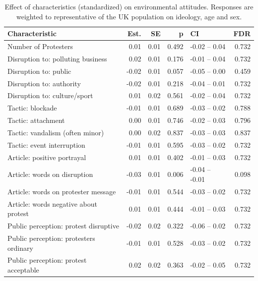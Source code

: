 \begin{table}[h!t]
\centering
\begin{tabular}{lrrrlr}
  \hline
Characteristic & Est. & SE & p & CI & FDR \\ 
  \hline
Number of Protesters & 0.01 & 0.01 & 0.492 & -0.02 -- 0.04 & 0.732 \\ 
  Disruption to: polluting business & 0.02 & 0.01 & 0.176 & -0.01 -- 0.04 & 0.732 \\ 
  Disruption to: public & -0.02 & 0.01 & 0.057 & -0.05 -- 0.00 & 0.459 \\ 
  Disruption to: authority & -0.02 & 0.01 & 0.218 & -0.04 -- 0.01 & 0.732 \\ 
  Disruption to: culture/sport & 0.01 & 0.02 & 0.561 & -0.02 -- 0.04 & 0.732 \\ 
  Tactic: blockade & -0.01 & 0.01 & 0.689 & -0.03 -- 0.02 & 0.788 \\ 
  Tactic: attachment & 0.00 & 0.01 & 0.746 & -0.02 -- 0.03 & 0.796 \\ 
  Tactic: vandalism (often minor) & 0.00 & 0.02 & 0.837 & -0.03 -- 0.03 & 0.837 \\ 
  Tactic: event interruption & -0.01 & 0.01 & 0.595 & -0.03 -- 0.02 & 0.732 \\ 
  Article: positive portrayal & 0.01 & 0.01 & 0.402 & -0.01 -- 0.03 & 0.732 \\ 
  Article: words on disruption & -0.03 & 0.01 & 0.006 & -0.04 -- -0.01 & 0.098 \\ 
  Article: words on protester message & -0.01 & 0.01 & 0.544 & -0.03 -- 0.02 & 0.732 \\ 
  Article: words negative about protest & 0.01 & 0.01 & 0.444 & -0.01 -- 0.03 & 0.732 \\ 
  Public perception: protest disruptive & -0.02 & 0.02 & 0.322 & -0.06 -- 0.02 & 0.732 \\ 
  Public perception: protesters ordinary & -0.01 & 0.01 & 0.528 & -0.03 -- 0.02 & 0.732 \\ 
  Public perception: protest acceptable & 0.02 & 0.02 & 0.363 & -0.02 -- 0.05 & 0.732 \\ 
   \hline
\end{tabular}
\caption{Effect of characteristics (standardized) on environmental attitudes.
                   Responses are weighted to representative of the UK population on ideology, age and sex.} 
\label{tab:char_demweights}
\end{table}
